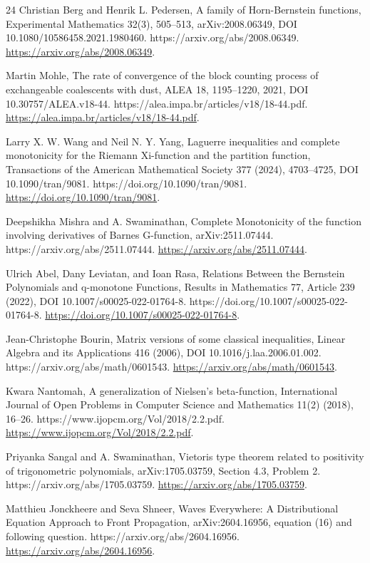 \documentclass[11pt]{article}
\numberwithin{equation}{section}
\theoremstyle{definition}
\theoremstyle{remark}
\newcommand{\1}{\mathbf 1}
\begin{document}
\begin{thebibliography}{24}
Christian Berg and Henrik L. Pedersen, A family of Horn-Bernstein functions, Experimental Mathematics 32(3), 505--513, arXiv:2008.06349, DOI 10.1080/10586458.2021.1980460. https://arxiv.org/abs/2008.06349.
\url{https://arxiv.org/abs/2008.06349}.

Martin Mohle, The rate of convergence of the block counting process of exchangeable coalescents with dust, ALEA 18, 1195--1220, 2021, DOI 10.30757/ALEA.v18-44. https://alea.impa.br/articles/v18/18-44.pdf.
\url{https://alea.impa.br/articles/v18/18-44.pdf}.

Larry X. W. Wang and Neil N. Y. Yang, Laguerre inequalities and complete monotonicity for the Riemann Xi-function and the partition function, Transactions of the American Mathematical Society 377 (2024), 4703--4725, DOI 10.1090/tran/9081. https://doi.org/10.1090/tran/9081.
\url{https://doi.org/10.1090/tran/9081}.

Deepshikha Mishra and A. Swaminathan, Complete Monotonicity of the function involving derivatives of Barnes G-function, arXiv:2511.07444. https://arxiv.org/abs/2511.07444.
\url{https://arxiv.org/abs/2511.07444}.

Ulrich Abel, Dany Leviatan, and Ioan Rasa, Relations Between the Bernstein Polynomials and q-monotone Functions, Results in Mathematics 77, Article 239 (2022), DOI 10.1007/s00025-022-01764-8. https://doi.org/10.1007/s00025-022-01764-8.
\url{https://doi.org/10.1007/s00025-022-01764-8}.

Jean-Christophe Bourin, Matrix versions of some classical inequalities, Linear Algebra and its Applications 416 (2006), DOI 10.1016/j.laa.2006.01.002. https://arxiv.org/abs/math/0601543.
\url{https://arxiv.org/abs/math/0601543}.

Kwara Nantomah, A generalization of Nielsen's beta-function, International Journal of Open Problems in Computer Science and Mathematics 11(2) (2018), 16--26. https://www.ijopcm.org/Vol/2018/2.2.pdf.
\url{https://www.ijopcm.org/Vol/2018/2.2.pdf}.

Priyanka Sangal and A. Swaminathan, Vietoris type theorem related to positivity of trigonometric polynomials, arXiv:1705.03759, Section 4.3, Problem 2. https://arxiv.org/abs/1705.03759.
\url{https://arxiv.org/abs/1705.03759}.

Matthieu Jonckheere and Seva Shneer, Waves Everywhere: A Distributional Equation Approach to Front Propagation, arXiv:2604.16956, equation (16) and following question. https://arxiv.org/abs/2604.16956.
\url{https://arxiv.org/abs/2604.16956}.

\end{thebibliography}
\end{document}
